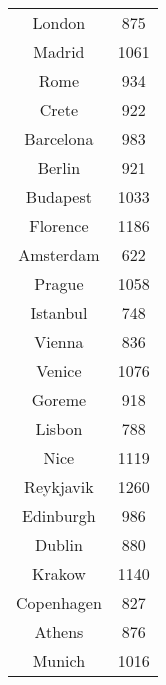 \documentclass[12pt]{article}
\begin{document}
\begin{table}[ht]
\begin{minipage}[b]{0.45\linewidth}
\begin{tabular}{c|c}
			London & 875 \\
			Madrid & 1061 \\
			Rome & 934 \\
			Crete & 922 \\
			Barcelona & 983 \\
			Berlin & 921 \\
			Budapest & 1033 \\
			Florence & 1186 \\
			Amsterdam & 622 \\
			Prague & 1058 \\
			Istanbul & 748 \\
			Vienna & 836 \\
			Venice & 1076 \\
			Goreme & 918 \\
			Lisbon & 788 \\
			Nice & 1119 \\
			Reykjavik & 1260 \\
			Edinburgh & 986 \\
			Dublin & 880 \\
			Krakow & 1140 \\
			Copenhagen & 827 \\
			Athens & 876 \\
			Munich & 1016 \\
		\end{tabular}
	\end{minipage}
\end{table}

\pagebreak
\end{document}
